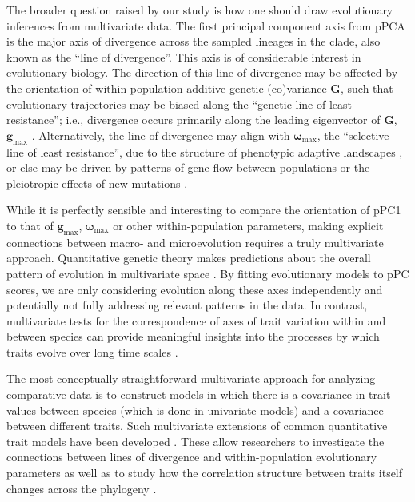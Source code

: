 \documentclass[a4paper,11pt]{article}
\begin{document}
The broader question raised by our study is how one should draw evolutionary inferences from multivariate data. The first principal component axis from pPCA is the major axis of divergence across the sampled lineages in the clade, also known as the ``line of divergence''. This axis is of considerable interest in evolutionary biology. The direction of this line of divergence may be affected by the orientation of within-population additive genetic (co)variance $\mathbf{G}$, such that evolutionary trajectories may be biased along the ``genetic line of least resistance''; i.e., divergence occurs primarily along the leading eigenvector of $\mathbf{G}$, $\mathbf{g}_{\text{max}}$ \citep{Schluter1996}. Alternatively, the line of divergence may align with $\boldsymbol{\omega}_{\text{max}}$, the  ``selective line of least resistance'', due to the structure of phenotypic adaptive landscapes \citep{Arnoldetal2001, Jonesetal2007, Arnoldetal2008}, or else may be driven by patterns of gene flow between populations \citep{Guillaume2007} or the pleiotropic effects of new mutations \citep{Jonesetal2007, Hether2013}. 

While it is perfectly sensible and interesting to compare the orientation of pPC1 to that of $\mathbf{g}_{\text{max}}$, $\boldsymbol{\omega}_{\text{max}}$ or other within-population parameters, making explicit connections between macro- and microevolution requires a truly multivariate approach. Quantitative genetic theory makes predictions about the overall pattern of evolution in multivariate space \citep{Lande1979}. By fitting evolutionary models to pPC scores, we are only considering evolution along these axes independently and potentially not fully addressing relevant patterns in the data. In contrast, 
multivariate tests for the correspondence of axes of trait variation within and between species can provide meaningful insights into the processes by which traits evolve over long time scales \citep{Hohenlohe2008, Bolstad2014}.

The most conceptually straightforward multivariate approach for analyzing comparative data is to construct models in which there is a covariance in trait values between species (which is done in univariate models) and a covariance between different traits. Such multivariate extensions of common quantitative trait models have been developed \citep{ButlerKing2004, RevellHarmon2008, Hohenlohe2008, RevellCollar2009, motmot}. These allow researchers to investigate the connections between lines of divergence and within-population evolutionary parameters \citep{Hohenlohe2008} as well as to study how the correlation structure between traits itself changes across the phylogeny \citep{RevellCollar2009}. 
\end{document}
